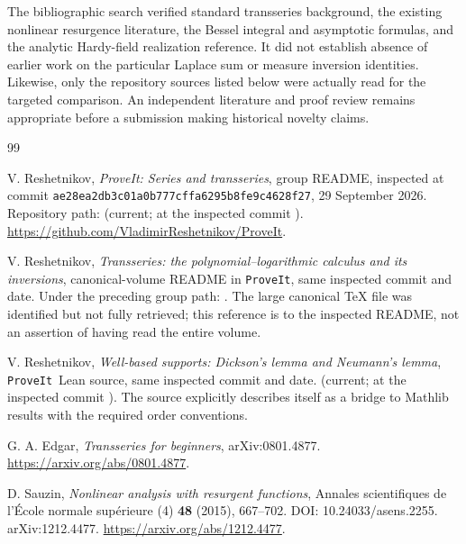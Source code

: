 \documentclass[11pt,a4paper]{article}
\theoremstyle{definition}
\theoremstyle{remark}
\newcommand{\repo}{\texttt{ProveIt}}
\newcommand{\code}[1]{\nolinkurl{#1}}
\numberwithin{equation}{section}
\begin{document}
The bibliographic search verified standard transseries background, the existing nonlinear resurgence literature, the Bessel integral and asymptotic formulas, and the analytic Hardy-field realization reference. It did not establish absence of earlier work on the particular Laplace sum or measure inversion identities. Likewise, only the repository sources listed below were actually read for the targeted comparison. An independent literature and proof review remains appropriate before a submission making historical novelty claims.

\begin{thebibliography}{99}
\small\raggedright
{}
V. Reshetnikov, \emph{ProveIt: Series and transseries}, group README,
inspected at commit \code{ae28ea2db3c01a0b777cffa6295b8fe9c4628f27},
29 September 2026. Repository path:
(current; at the inspected commit
).
\url{https://github.com/VladimirReshetnikov/ProveIt}.

V. Reshetnikov, \emph{Transseries: the polynomial--logarithmic calculus and its inversions}, canonical-volume README in \repo, same inspected commit and date. Under the preceding group path:
.
The large canonical TeX file was identified but not fully retrieved; this reference is to the inspected README, not an assertion of having read the entire volume.

V. Reshetnikov, \emph{Well-based supports: Dickson's lemma and Neumann's lemma},
\repo\ Lean source, same inspected commit and date.
(current; at the inspected commit
).
The source explicitly describes itself as a bridge to Mathlib results with the required order conventions.

G. A. Edgar, \emph{Transseries for beginners}, arXiv:0801.4877.
\url{https://arxiv.org/abs/0801.4877}.

D. Sauzin, \emph{Nonlinear analysis with resurgent functions},
Annales scientifiques de l'\'Ecole normale sup\'erieure (4) \textbf{48} (2015), 667--702.
DOI: 10.24033/asens.2255. arXiv:1212.4477.
\url{https://arxiv.org/abs/1212.4477}.


\end{thebibliography}
\end{document}
